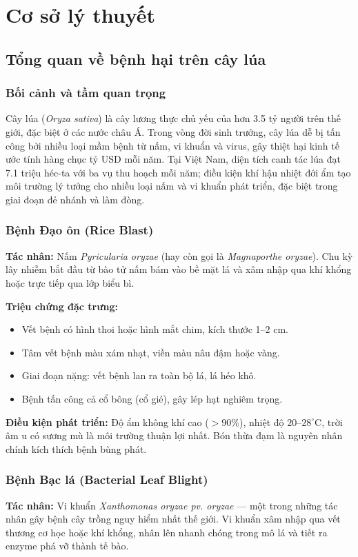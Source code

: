 \chapter{Cơ sở lý thuyết}
\section{Tổng quan về bệnh hại trên cây lúa}
\subsection{Bối cảnh và tầm quan trọng}
Cây lúa (\textit{Oryza sativa}) là cây lương thực chủ yếu của hơn 3.5 tỷ người trên thế giới, đặc biệt ở các nước châu Á. Trong vòng đời sinh trưởng, cây lúa dễ bị tấn công bởi nhiều loại mầm bệnh từ nấm, vi khuẩn và virus, gây thiệt hại kinh tế ước tính hàng chục tỷ USD mỗi năm. Tại Việt Nam, diện tích canh tác lúa đạt 7.1 triệu héc-ta với ba vụ thu hoạch mỗi năm; điều kiện khí hậu nhiệt đới ẩm tạo môi trường lý tưởng cho nhiều loại nấm và vi khuẩn phát triển, đặc biệt trong giai đoạn đẻ nhánh và làm đòng.

\subsection{Bệnh Đạo ôn (Rice Blast)}
\textbf{Tác nhân:} Nấm \textit{Pyricularia oryzae} (hay còn gọi là \textit{Magnaporthe oryzae}). Chu kỳ lây nhiễm bắt đầu từ bào tử nấm bám vào bề mặt lá và xâm nhập qua khí khổng hoặc trực tiếp qua lớp biểu bì.

\textbf{Triệu chứng đặc trưng:}
\begin{itemize}[leftmargin=1.5cm]
    \item Vết bệnh có hình thoi hoặc hình mắt chim, kích thước 1--2 cm.
    \item Tâm vết bệnh màu xám nhạt, viền màu nâu đậm hoặc vàng.
    \item Giai đoạn nặng: vết bệnh lan ra toàn bộ lá, lá héo khô.
    \item Bệnh tấn công cả cổ bông (cổ gié), gây lép hạt nghiêm trọng.
\end{itemize}

\textbf{Điều kiện phát triển:} Độ ẩm không khí cao ($>90\%$), nhiệt độ $20$--$28^\circ$C, trời âm u có sương mù là môi trường thuận lợi nhất. Bón thừa đạm là nguyên nhân chính kích thích bệnh bùng phát.

\subsection{Bệnh Bạc lá (Bacterial Leaf Blight)}
\textbf{Tác nhân:} Vi khuẩn \textit{Xanthomonas oryzae pv. oryzae} --- một trong những tác nhân gây bệnh cây trồng nguy hiểm nhất thế giới. Vi khuẩn xâm nhập qua vết thương cơ học hoặc khí khổng, nhân lên nhanh chóng trong mô lá và tiết ra enzyme phá vỡ thành tế bào.

